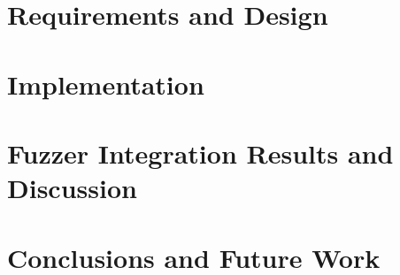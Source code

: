 \documentclass[12pt,a4paper]{report}
\begin{document}


\chapter{Requirements and Design}




\chapter{Implementation}



\chapter{Fuzzer Integration Results and Discussion}



\chapter{Conclusions and Future Work}





\appendix
\end{document}
